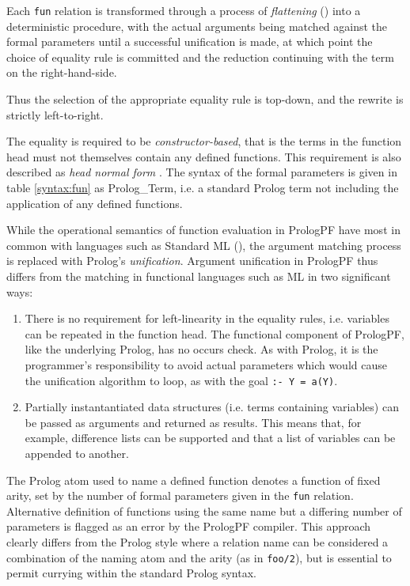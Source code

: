 Each \texttt{fun} relation is transformed through a process of \textit{flattening}
(\cite{CF93}) into a deterministic procedure, with the actual arguments being
matched against the formal parameters until a successful unification is made, at which
point the choice of equality rule is committed and the reduction continuing with the
term on the right-hand-side.

Thus the selection of the appropriate equality rule is top-down, and the rewrite
is strictly left-to-right.

The equality is required to be \textit{constructor-based}, that is the terms in the
function head must not themselves contain any defined functions. 
This requirement is also described as \textit{head normal form} \cite{HAK+97}.
The syntax of the
formal parameters is given in table \ref{syntax:fun} as Prolog\_{}Term, i.e. a
standard Prolog term not including the application of any defined functions.

While the operational semantics of function evaluation in PrologPF 
have most in common with
languages such as Standard ML (\cite{Pau91}), the argument matching process is
replaced with Prolog's \textit{unification}.  Argument unification in PrologPF thus
differs from the matching in functional languages such as ML in two significant
ways:
\begin{enumerate}
\item{There is no requirement for left-linearity
  in the equality rules, i.e. variables can be repeated in the function head.  The
  functional component of PrologPF, like the underlying Prolog, has no occurs check.
  As with Prolog, it is the programmer's responsibility to avoid actual parameters which
  would cause the unification algorithm to loop, as with the goal \texttt{:- Y = a(Y)}.
}
\item{Partially instantantiated data structures (i.e. terms
containing variables) can be passed as arguments and returned as results.  This
means that, for example, difference lists can be supported and that a list of 
variables can be appended to another.}
\end{enumerate}

The Prolog atom used to name a defined function denotes a function of fixed arity, set
by the number of formal parameters given in the \texttt{fun} relation.  Alternative
definition of functions using the same name but a differing number of parameters is
flagged as an error by the PrologPF compiler.  This approach clearly differs from the
Prolog style where a relation name can be considered a combination of the naming
atom and the arity (as in \texttt{foo/2}), but is essential to permit currying within
the standard Prolog syntax.

